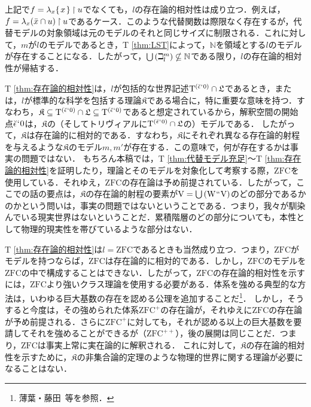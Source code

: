 \noindent 上記で$f = \lambda_x\{\mspace{2mu}x\mspace{2mu}\}\mathbin{\upharpoonright} u$でなくても，$l$の存在論的相対性は成り立つ．例えば，$ f = \lambda_x(\bar{x}\cap u)\mathbin{\upharpoonright} u $であるケース．このような代替関数は際限なく存在するが，代替モデルの対象領域は元のモデルのそれと同じサイズに制限される．これに対して，$m$が$l$のモデルであるとき，T \ref{thm:LST}によって，$\mathbb{N}$を領域とする$l$のモデルが存在することになる．したがって，${\textstyle\bigcup}\mspace{3mu}(\beth^m_l)\nsubseteq\mathbb{N}$である限り，$l$の存在論的相対性が帰結する．

T \ref{thm:存在論的相対性}は，$l$が包括的な世界記述$\mathrm{T}^{(\breve{\epsilon}{\mspace{1mu}{`}\mspace{1mu}} 0)}\cap\mathfrak{L}$であるとき，または，$l$が標準的な科学を包括する理論$\mathfrak{K}$である場合に，特に重要な意味を持つ．すなわち，$\mathfrak{K}\subseteq \mathrm{T}^{(\breve{\epsilon}{\mspace{1mu}{`}\mspace{1mu}} 0)}\cap\mathfrak{L}\subseteq\mathrm{T}^{(\breve{\epsilon}{\mspace{1mu}{`}\mspace{1mu}} 0)}$であると想定されているから，解釈空間の開始点$\breve{\epsilon}{\mspace{1mu}{`}\mspace{1mu}} 0 $は，$\mathfrak{K}$の（そしてトリヴィアルに$\mathrm{T}^{(\breve{\epsilon}{\mspace{1mu}{`}\mspace{1mu}} 0)}\cap\mathfrak{L}$の）モデルである．
したがって，$\mathfrak{K}$は存在論的に相対的である．すなわち，$\mathfrak{K}$にそれぞれ異なる存在論的射程を与えるような$\mathfrak{K}$のモデル$m,m'$が存在する．この意味で，何が存在するかは事実の問題ではない．
もちろん本稿では，T \ref{thm:代替モデル充足}〜T \ref{thm:存在論的相対性}を証明したり，理論とそのモデルを対象化して考察する際，$\mathrm{ZFC}$を使用している．それゆえ，$\mathrm{ZFC}$の存在論は予め前提されている．したがって，ここでの話の要点は，$\mathfrak{K}$の存在論的射程の要素が$\mathrm{V} = {\textstyle\bigcup}\mspace{3mu}(\mathrm{W}{\mspace{1mu}{``}\mspace{1mu}}\mathrm{V})$のどの部分であるかのかという問いは，事実の問題ではないということである．つまり，我々が馴染んでいる現実世界はないということだ．累積階層のどの部分についても，本性として物理的現実性を帯びているような部分はない．

T \ref{thm:存在論的相対性}は$l=\mathrm{ZFC}$であるときも当然成り立つ．つまり，$\mathrm{ZFC}$がモデルを持つならば，$\mathrm{ZFC}$は存在論的に相対的である．しかし，$\mathrm{ZFC}$のモデルを$\mathrm{ZFC}$の中で構成することはできない．したがって，$\mathrm{ZFC}$の存在論的相対性を示すには，$\mathrm{ZFC}$より強いクラス理論を使用する必要がある．体系を強める典型的な方法は，いわゆる巨大基数の存在を認める公理を追加することだ\footnote{
    薄葉・藤田~\cite{薄葉}等を参照．
}．
しかし，そうすると今度は，その強められた体系$\mathrm{ZFC}^{+}$の存在論が，それゆえに$\mathrm{ZFC}$の存在論が予め前提される．さらに$\mathrm{ZFC}^{+}$に対しても，それが認める以上の巨大基数を要請してそれを強めることができるが（$\mathrm{ZFC}^{++}$），後の展開は同じことだ．つまり，$\mathrm{ZFC}$は事実上常に実在論的に解釈される．
これに対して，$\mathfrak{K}$の存在論的相対性を示すために，$\mathfrak{K}$の非集合論的定理のような物理的世界に関する理論が必要になることはない．

